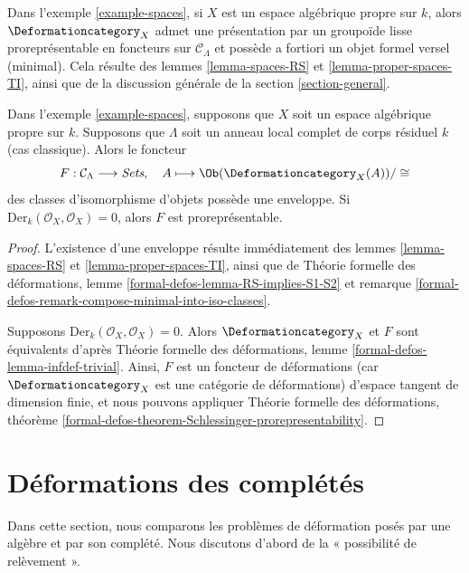 \noindent
Dans l'exemple \ref{example-spaces}, si $X$ est un espace algébrique propre sur $k$,
alors $\Deformationcategory_X$
admet une présentation par un groupoïde lisse proreprésentable en foncteurs
sur $\mathcal{C}_\Lambda$
et possède a fortiori un objet formel versel (minimal). Cela résulte
des lemmes \ref{lemma-spaces-RS} et
\ref{lemma-proper-spaces-TI},
ainsi que de la discussion générale de la section \ref{section-general}.

\begin{lemma}
\label{lemma-spaces-hull}
Dans l'exemple \ref{example-spaces}, supposons que $X$ soit un espace algébrique propre sur $k$.
Supposons que $\Lambda$ soit un anneau local complet de corps résiduel $k$
(cas classique). Alors le foncteur
$$
F : \mathcal{C}_\Lambda \longrightarrow \textit{Sets},\quad
A \longmapsto \Ob(\Deformationcategory_X(A))/\cong
$$
des classes d'isomorphisme d'objets possède une enveloppe. Si
$\text{Der}_k(\mathcal{O}_X, \mathcal{O}_X) = 0$, alors
$F$ est proreprésentable.
\end{lemma}

\begin{proof}
L'existence d'une enveloppe résulte immédiatement des
lemmes \ref{lemma-spaces-RS} et \ref{lemma-proper-spaces-TI}, ainsi que de
Théorie formelle des déformations, lemme \ref{formal-defos-lemma-RS-implies-S1-S2}
et remarque \ref{formal-defos-remark-compose-minimal-into-iso-classes}.

\medskip\noindent
Supposons $\text{Der}_k(\mathcal{O}_X, \mathcal{O}_X) = 0$. Alors
$\Deformationcategory_X$ et $F$ sont équivalents d'après
Théorie formelle des déformations, lemme \ref{formal-defos-lemma-infdef-trivial}.
Ainsi, $F$ est un foncteur de déformations (car $\Deformationcategory_X$ est une
catégorie de déformations) d'espace tangent de dimension finie, et nous pouvons appliquer
Théorie formelle des déformations, théorème
\ref{formal-defos-theorem-Schlessinger-prorepresentability}.
\end{proof}





\section{Déformations des complétés}
\label{section-compare}

\noindent
Dans cette section, nous comparons les problèmes de déformation posés
par une algèbre et par son complété.
Nous discutons d'abord de la « possibilité de relèvement ».


